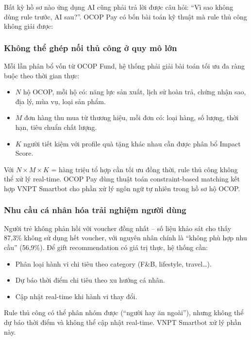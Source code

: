 \documentclass[13pt,a4paper]{extarticle}
\begin{document}
Bất kỳ hồ sơ nào ứng dụng AI cũng phải trả lời được câu hỏi: ``Vì sao không dùng rule trước, AI sau?''. OCOP Pay có bốn bài toán kỹ thuật mà rule thủ công không giải được:

\subsubsection{Không thể ghép nối thủ công ở quy mô lớn}

Mỗi lần phân bổ vốn từ OCOP Fund, hệ thống phải giải bài toán tối ưu đa ràng buộc theo thời gian thực:

\begin{itemize}
    \item $N$ hộ OCOP, mỗi hộ có: năng lực sản xuất, lịch sử hoàn trả, chứng nhận sao, địa lý, mùa vụ, loại sản phẩm.
    \item $M$ đơn hàng thu mua từ thương hiệu, mỗi đơn có: loại hàng, số lượng, thời hạn, tiêu chuẩn chất lượng.
    \item $K$ người tiết kiệm với profile quà tặng khác nhau cần được phân bổ Impact Score.
\end{itemize}

Với $N \times M \times K$ = hàng triệu tổ hợp cần tối ưu đồng thời, rule thủ công không thể xử lý real-time. OCOP Pay dùng thuật toán constraint-based matching kết hợp VNPT Smartbot cho phần xử lý ngôn ngữ tự nhiên trong hồ sơ hộ OCOP.

\subsubsection{Nhu cầu cá nhân hóa trải nghiệm người dùng}

Người trẻ không phản hồi với voucher đồng nhất -- số liệu khảo sát cho thấy 87,3\% không sử dụng hết voucher, với nguyên nhân chính là ``không phù hợp nhu cầu'' (56,9\%). Để gift recommendation có giá trị thực, hệ thống cần:

\begin{itemize}
    \item Phân loại hành vi chi tiêu theo category (F\&B, lifestyle, travel\ldots).
    \item Dự báo thời điểm chi tiêu theo xu hướng cá nhân.
    \item Cập nhật real-time khi hành vi thay đổi.
\end{itemize}

Rule thủ công có thể phân nhóm được (``người hay ăn ngoài''), nhưng không thể dự báo thời điểm và không thể cập nhật real-time. VNPT Smartbot xử lý phần này.
\end{document}
